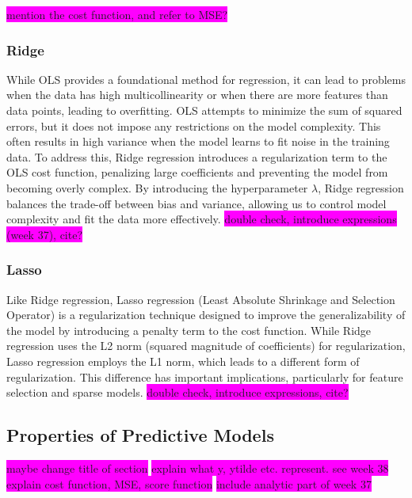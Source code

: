 \documentclass[aps,pra,english,notitlepage,reprint,nofootinbib]{revtex4-1}  %
\begin{document}
\colorbox{magenta}{mention the cost function, and refer to MSE?}


\subsubsection{Ridge}\label{subsubsec:ridge} 
While OLS provides a foundational method for regression, it can lead to problems when the data has high multicollinearity or when there are more features than data points, leading to overfitting. OLS attempts to minimize the sum of squared errors, but it does not impose any restrictions on the model complexity. This often results in high variance when the model learns to fit noise in the training data. To address this, Ridge regression introduces a regularization term to the OLS cost function, penalizing large coefficients and preventing the model from becoming overly complex. By introducing the hyperparameter $\lambda$, Ridge regression balances the trade-off between bias and variance, allowing us to control model complexity and fit the data more effectively. \colorbox{magenta}{double check, introduce expressions (week 37), cite?}


\subsubsection{Lasso}\label{subsubsec:lasso} 
Like Ridge regression, Lasso regression (Least Absolute Shrinkage and Selection Operator) is a regularization technique designed to improve the generalizability of the model by introducing a penalty term to the cost function. While Ridge regression uses the L2 norm (squared magnitude of coefficients) for regularization, Lasso regression employs the L1 norm, which leads to a different form of regularization. This difference has important implications, particularly for feature selection and sparse models. \colorbox{magenta}{double check, introduce expressions, cite?}


\subsection{Properties of Predictive Models}\label{subsec:tradeoff}
\colorbox{magenta}{maybe change title of section}
\colorbox{magenta}{explain what y, ytilde etc. represent. see week 38}
\colorbox{magenta}{explain cost function, MSE, score function}
\colorbox{magenta}{include analytic part of week 37}
\end{document}

